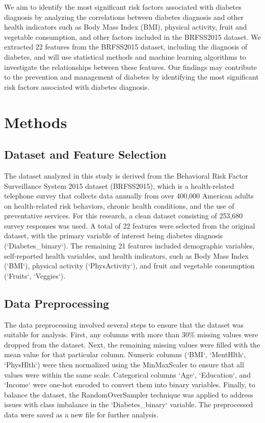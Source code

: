 \documentclass[12pt]{article}
\begin{document}
We aim to identify the most significant risk factors associated with diabetes diagnosis by analyzing the correlations between diabetes diagnosis and other health indicators such as Body Mass Index (BMI), physical activity, fruit and vegetable consumption, and other factors included in the BRFSS2015 dataset. We extracted 22 features from the BRFSS2015 dataset, including the diagnosis of diabetes, and will use statistical methods and machine learning algorithms to investigate the relationships between these features. Our findings may contribute to the prevention and management of diabetes by identifying the most significant risk factors associated with diabetes diagnosis.

\section{Methods}
\subsection{Dataset and Feature Selection}
The dataset analyzed in this study is derived from the Behavioral Risk Factor Surveillance System 2015 dataset (BRFSS2015), which is a health-related telephone survey that collects data annually from over 400,000 American adults on health-related risk behaviors, chronic health conditions, and the use of preventative services. For this research, a clean dataset consisting of 253,680 survey responses was used. A total of 22 features were selected from the original dataset, with the primary variable of interest being diabetes diagnosis (`Diabetes\_binary`). The remaining 21 features included demographic variables, self-reported health variables, and health indicators, such as Body Mass Index (`BMI`), physical activity (`PhysActivity`), and fruit and vegetable consumption (`Fruits`, `Veggies`).

\subsection{Data Preprocessing}
The data preprocessing involved several steps to ensure that the dataset was suitable for analysis. First, any columns with more than 30\% missing values were dropped from the dataset. Next, the remaining missing values were filled with the mean value for that particular column. Numeric columns (`BMI`, `MentHlth`, `PhysHlth`) were then normalized using the MinMaxScaler to ensure that all values were within the same scale. Categorical columns `Age`, `Education`, and `Income` were one-hot encoded to convert them into binary variables. Finally, to balance the dataset, the RandomOverSampler technique was applied to address issues with class imbalance in the `Diabetes\_binary` variable. The preprocessed data were saved as a new file for further analysis.
\end{document}
